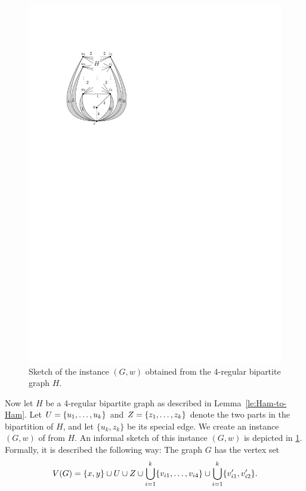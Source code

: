 \begin{figure}[htpb]
\centering
 \includegraphics[scale=1.1]{chapter-6-NTP/act-hamilton-cycle-a}
\caption{Sketch of the {\xxxNTP} instance $(G, w)$ obtained from the 4-regular bipartite graph $H$.}
\label{fig:reduction-overview}
\end{figure}
Now let $H$ be a 4-regular bipartite graph as described in Lemma~\ref{le:Ham-to-Ham}.
Let $U=\{ u_1, \ldots, u_k \}$ and $Z=\{ z_1, \ldots, z_k \}$ denote the two parts in the bipartition of $H$, 
and let $\{u_k,z_k\}$ be its special edge.
We create an instance $(G,w)$ of {\xxxNTP} from $H$. An informal sketch of this instance $(G,w)$ is depicted in \cref{fig:reduction-overview}. Formally, it is described the following way:
The graph $G$ has the vertex set 
\[ 
V(G) =  \{ x, y \} \cup U \cup Z 
        \cup \bigcup_{i=1}^k \{ v_{i1}, \ldots, v_{i4} \} \cup \bigcup_{i=1}^k \{ v'_{i1}, v'_{i2} \}.
\]
